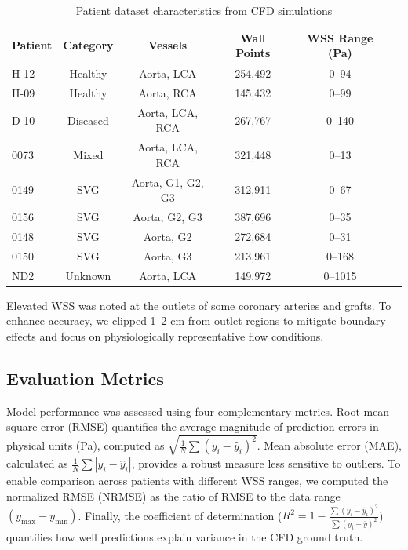 \documentclass[12pt,a4paper]{article}
\begin{document}
\begin{table}[htbp]
\centering
\caption{Patient dataset characteristics from CFD simulations}
\label{tab:patient_data}
\begin{tabular}{lccccc}
\toprule
\textbf{Patient} & \textbf{Category} & \textbf{Vessels} & \textbf{Wall Points} & \textbf{WSS Range (Pa)} \\
\midrule
H-12 & Healthy & Aorta, LCA & 254,492 & 0--94 \\
H-09 & Healthy & Aorta, RCA & 145,432 & 0--99 \\
D-10 & Diseased & Aorta, LCA, RCA & 267,767 & 0--140 \\
0073 & Mixed & Aorta, LCA, RCA & 321,448 & 0--13 \\
0149 & SVG & Aorta, G1, G2, G3 & 312,911 & 0--67 \\
0156 & SVG & Aorta, G2, G3 & 387,696 & 0--35 \\
0148 & SVG & Aorta, G2 & 272,684 & 0--31 \\
0150 & SVG & Aorta, G3 & 213,961 & 0--168 \\
ND2 & Unknown & Aorta, LCA & 149,972 & 0--1015 \\
\bottomrule
\end{tabular}
\end{table}

Elevated WSS was noted at the outlets of some coronary arteries and grafts. To enhance accuracy, we clipped 1--2 cm from outlet regions to mitigate boundary effects and focus on physiologically representative flow conditions.

\subsection{Evaluation Metrics}

Model performance was assessed using four complementary metrics. Root mean square error (RMSE) quantifies the average magnitude of prediction errors in physical units (Pa), computed as $\sqrt{\frac{1}{N}\sum(y_i - \hat{y}_i)^2}$. Mean absolute error (MAE), calculated as $\frac{1}{N}\sum|y_i - \hat{y}_i|$, provides a robust measure less sensitive to outliers. To enable comparison across patients with different WSS ranges, we computed the normalized RMSE (NRMSE) as the ratio of RMSE to the data range $(y_{\max} - y_{\min})$. Finally, the coefficient of determination ($R^2 = 1 - \frac{\sum(y_i - \hat{y}_i)^2}{\sum(y_i - \bar{y})^2}$) quantifies how well predictions explain variance in the CFD ground truth.
\end{document}
